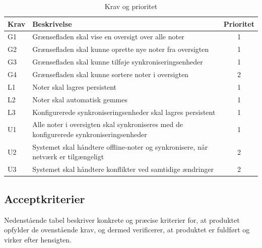 \documentclass{article}
\begin{document}
\begin{table}[ht]
  \centering
  \begin{tabular}{|l|p{9cm}|c|}
    \hline
    \textbf{Krav} & \textbf{Beskrivelse} & \textbf{Prioritet} \\
    \hline
    G1 & Grænsefladen skal vise en oversigt over alle noter & 1 \\
    \hline
    G2 & Grænsefladen skal kunne oprette nye noter fra oversigten & 1 \\
    \hline
    G3 & Grænsefladen skal kunne tilføje synkroniseringsenheder & 1 \\
    \hline
    G4 & Grænsefladen skal kunne sortere noter i oversigten & 2 \\
    \hline
    L1 & Noter skal lagres persistent & 1 \\
    \hline
    L2 & Noter skal automatisk gemmes & 1 \\
    \hline
    L3 & Konfigurerede synkroniseringsenheder skal lagres persistent & 1 \\
    \hline
    U1 & Alle noter i oversigten skal synkroniseres med de konfigurerede
         synkroniseringsenheder & 1 \\
    \hline
    U2 & Systemet skal håndtere offline-noter og synkronisere,
         når netværk er tilgængeligt & 2 \\
    \hline
    U3 & Systemet skal håndtere konflikter ved samtidige ændringer & 2 \\
    \hline
  \end{tabular}
  \caption{Krav og prioritet}
  \label{tab:krav}
\end{table}

\subsection{Acceptkriterier}
Nedenstående tabel beskriver konkrete og præcise kriterier for, at
produktet opfylder de ovenstående krav, og dermed verificerer, at
produktet er fuldført og virker efter hensigten.
\end{document}
